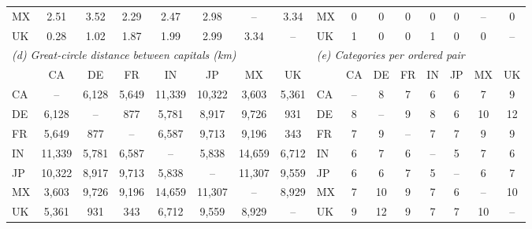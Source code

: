 \begin{table}[H]
\begin{tabular}{lccccccc@{\hspace{14pt}}lccccccc}
MX & 2.51 & 3.52 & 2.29 & 2.47 & 2.98 & -- & 3.34 & MX & 0 & 0 & 0 & 0 & 0 & -- & 0 \\
UK & 0.28 & 1.02 & 1.87 & 1.99 & 2.99 & 3.34 & -- & UK & 1 & 0 & 0 & 1 & 0 & 0 & -- \\
\midrule
\multicolumn{8}{l}{\textit{(d) Great-circle distance between capitals (km)}} & \multicolumn{8}{l}{\textit{(e) Categories per ordered pair}} \\
 & CA & DE & FR & IN & JP & MX & UK &  & CA & DE & FR & IN & JP & MX & UK \\
\midrule
CA & -- & 6,128 & 5,649 & 11,339 & 10,322 & 3,603 & 5,361 & CA & -- & 8 & 7 & 6 & 6 & 7 & 9 \\
DE & 6,128 & -- & 877 & 5,781 & 8,917 & 9,726 & 931 & DE & 8 & -- & 9 & 8 & 6 & 10 & 12 \\
FR & 5,649 & 877 & -- & 6,587 & 9,713 & 9,196 & 343 & FR & 7 & 9 & -- & 7 & 7 & 9 & 9 \\
IN & 11,339 & 5,781 & 6,587 & -- & 5,838 & 14,659 & 6,712 & IN & 6 & 7 & 6 & -- & 5 & 7 & 6 \\
JP & 10,322 & 8,917 & 9,713 & 5,838 & -- & 11,307 & 9,559 & JP & 6 & 6 & 7 & 5 & -- & 6 & 7 \\
MX & 3,603 & 9,726 & 9,196 & 14,659 & 11,307 & -- & 8,929 & MX & 7 & 10 & 9 & 7 & 6 & -- & 10 \\
UK & 5,361 & 931 & 343 & 6,712 & 9,559 & 8,929 & -- & UK & 9 & 12 & 9 & 7 & 7 & 10 & -- \\
\bottomrule
\end{tabular}
\par\vspace{2pt}{\footnotesize\noindent PDI power distance, IDV individualism, MAS masculinity, UAI uncertainty avoidance, LTO long-term orientation, IVR indulgence. (c) 1 = the two countries share an official language; coded languages: CA en/fr; DE de; FR fr; IN en; JP ja; MX es; UK en. (e) Categories contributing to each ordered pair in the single-donor gain outcome (row: target, column: donor); ordered country pairs are averaged over different, incomplete sets of categories; the permutation test keeps these sets attached to their pair.\par}
\end{table}
